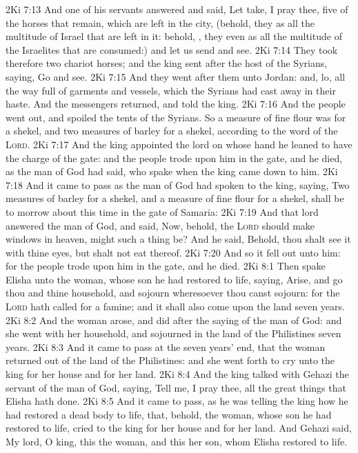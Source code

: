 \vs 2Ki 7:13 And one of his servants answered and said, Let  take, I pray thee, five of the horses that remain, which are left in the city, (behold, they  as all the multitude of Israel that are left in it: behold, , they  even as all the multitude of the Israelites that are consumed:) and let us send and see.
\vs 2Ki 7:14 They took therefore two chariot horses; and the king sent after the host of the Syrians, saying, Go and see.
\vs 2Ki 7:15 And they went after them unto Jordan: and, lo, all the way  full of garments and vessels, which the Syrians had cast away in their haste. And the messengers returned, and told the king.
\vs 2Ki 7:16 And the people went out, and spoiled the tents of the Syrians. So a measure of fine flour was  for a shekel, and two measures of barley for a shekel, according to the word of the \textsc{Lord}.
\vs 2Ki 7:17 And the king appointed the lord on whose hand he leaned to have the charge of the gate: and the people trode upon him in the gate, and he died, as the man of God had said, who spake when the king came down to him.
\vs 2Ki 7:18 And it came to pass as the man of God had spoken to the king, saying, Two measures of barley for a shekel, and a measure of fine flour for a shekel, shall be to morrow about this time in the gate of Samaria:
\vs 2Ki 7:19 And that lord answered the man of God, and said, Now, behold,  the \textsc{Lord} should make windows in heaven, might such a thing be? And he said, Behold, thou shalt see it with thine eyes, but shalt not eat thereof.
\vs 2Ki 7:20 And so it fell out unto him: for the people trode upon him in the gate, and he died.
\vs 2Ki 8:1 Then spake Elisha unto the woman, whose son he had restored to life, saying, Arise, and go thou and thine household, and sojourn wheresoever thou canst sojourn: for the \textsc{Lord} hath called for a famine; and it shall also come upon the land seven years.
\vs 2Ki 8:2 And the woman arose, and did after the saying of the man of God: and she went with her household, and sojourned in the land of the Philistines seven years.
\vs 2Ki 8:3 And it came to pass at the seven years' end, that the woman returned out of the land of the Philistines: and she went forth to cry unto the king for her house and for her land.
\vs 2Ki 8:4 And the king talked with Gehazi the servant of the man of God, saying, Tell me, I pray thee, all the great things that Elisha hath done.
\vs 2Ki 8:5 And it came to pass, as he was telling the king how he had restored a dead body to life, that, behold, the woman, whose son he had restored to life, cried to the king for her house and for her land. And Gehazi said, My lord, O king, this  the woman, and this  her son, whom Elisha restored to life.
